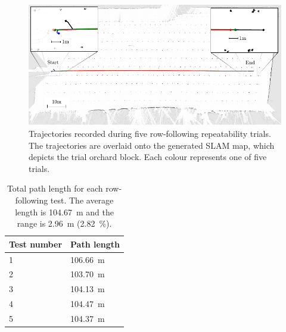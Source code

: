 \documentclass[preprint,authoryear,12pt]{elsarticle}
\begin{document}
    \begin{figure}[htb]
        \centering
        \includegraphics[width=\linewidth]{images/paths2.pdf}
        \caption{
            Trajectories recorded during five row-following repeatability trials.
            The trajectories are overlaid onto the generated SLAM map, which depicts the trial orchard block.
            Each colour represents one of five trials.
        }
        \label{fig:row_following_paths}
    \end{figure}

    \begin{table}[htbp]
      \centering
      \footnotesize
      \begin{tabular}{ l l}

          \textbf{Test number}      &\textbf{Path length} \\ \hline
          1 & \SI{106.66}{\meter}\\
          2 & \SI{103.70}{\meter}\\
          3 & \SI{104.13}{\meter}\\
          4 & \SI{104.47}{\meter}\\
          5 & \SI{104.37}{\meter}\\
      \end{tabular}
      \caption{Total path length for each row-following test. The average length is \SI{104.67}{\meter} and the range is \SI{2.96}{\meter} (\SI{2.82}{\percent}).}
      \label{table:row_follow_path_lenghts}
    \end{table}
\end{document}
